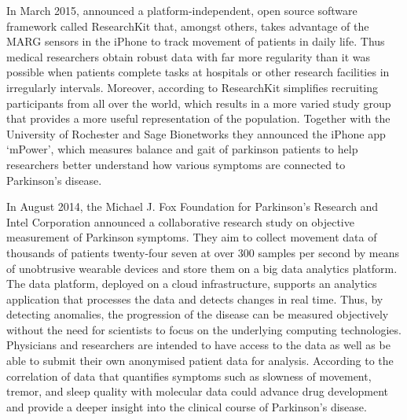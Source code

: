 In March 2015, \citeauthor{Apple_2015} announced a platform-independent, open source software framework called ResearchKit \cite{Apple_2015} that, amongst others, takes advantage of the MARG sensors in the iPhone to track movement of patients in daily life. Thus medical researchers obtain robust data with far more regularity than it was possible when patients complete tasks at hospitals or other research facilities in irregularly intervals. Moreover, according to \citeauthor{Apple_2015} ResearchKit simplifies recruiting participants from all over the world, which results in a more varied study group that provides a more useful representation of the population. Together with the University of Rochester and Sage Bionetworks they announced the iPhone app `mPower', which measures balance and gait of parkinson patients to help researchers better understand how various symptoms are connected to Parkinson's disease.

In August 2014, the Michael J. Fox Foundation for Parkinson’s Research and Intel Corporation \cite{Intel_2013} announced a collaborative research study on objective measurement of Parkinson symptoms. They aim to collect movement data of thousands of patients twenty-four seven at over 300 samples per second by means of unobtrusive wearable devices and store them on a big data analytics platform. The data platform, deployed on a cloud infrastructure, supports an analytics application that processes the data and detects changes in real time. Thus, by detecting anomalies, the progression of the disease can be measured objectively without the need for scientists to focus on the underlying computing technologies. Physicians and researchers are intended to have access to the data as well as be able to submit their own anonymised patient data for analysis. According to \cite{Intel_2013} the correlation of data that quantifies symptoms such as slowness of movement, tremor, and sleep quality with molecular data could advance drug development and provide a deeper insight into the clinical course of Parkinson's disease.



